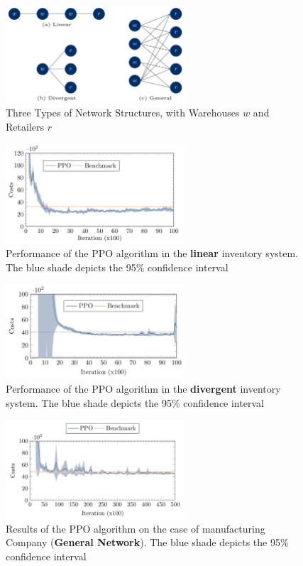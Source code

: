 \documentclass[12pt]{article}
\begin{document}
\begin{figure}[H]
    \centering
    \includegraphics[width=0.6\textwidth]{Images/threenetworks.png}
    \caption{Three Types of Network Structures, with Warehouses $w$ and Retailers $r$}
    \label{fig:5-threenetwork}
\end{figure} 

\begin{figure}[H]
    \centering
    \includegraphics[width=0.6\textwidth]{Images/linearnetwork.png}
    \caption{Performance of the PPO algorithm in the \textbf{linear} inventory system. The blue shade depicts the 95\% confidence interval}
    \label{fig:5-linearnetwork}
\end{figure} 

\begin{figure}[H]
    \centering
    \includegraphics[width=0.6\textwidth]{Images/divergentnetwork.png}
    \caption{Performance of the PPO algorithm in the \textbf{divergent} inventory system. The blue shade depicts the 95\% confidence interval}
    \label{fig:5-divergentnetwork}
\end{figure} 

\begin{figure}[H]
    \centering
    \includegraphics[width=0.6\textwidth]{Images/generalnetwork.png}
    \caption{Results of the PPO algorithm on the case of manufacturing Company (\textbf{General Network}). The blue shade depicts the 95\% confidence interval}
    \label{fig:5-generalnetwork}
\end{figure} 

\newpage



\end{document}
